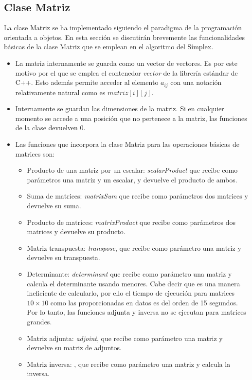\documentclass[12pt, titlepage]{article}
\begin{document}
\subsection{Clase Matriz}
La clase Matriz se ha implementado siguiendo el paradigma de la programación orientada a objetos. En esta sección se discutirán brevemente las funcionalidades básicas de la clase Matriz que se emplean en el algoritmo del Símplex.
\begin{itemize}
\item	La matriz internamente se guarda como un vector de vectores. Es por este motivo por el que se emplea el contenedor \textit{vector} de la librería estándar de C++. Esto además permite acceder al elemento $a_{ij}$ con una notación relativamente natural como es $matriz[i][j]$.
\item	Internamente se guardan las dimensiones de la matriz. Si en cualquier momento se accede a una posición que no pertenece a la matriz, las funciones de la clase devuelven $0$. 
\item	Las funciones que incorpora la clase Matriz para las operaciones básicas de matrices son:
\begin{itemize}
\item	Producto de una matriz por un escalar: \textit{scalarProduct} que recibe como parámetros una matriz y un escalar, y devuelve el producto de ambos.
\item	Suma de matrices: \textit{matrixSum} que recibe como parámetros dos matrices y devuelve su suma.
\item	Producto de matrices: \textit{matrixProduct} que recibe como parámetros dos matrices y devuelve su producto.
\item	Matriz transpuesta: \textit{transpose}, que recibe como parámetro una matriz y devuelve su transpuesta.
\item	Determinante: \textit{determinant} que recibe como parámetro una matriz y calcula el determinante usando menores. Cabe decir que es una manera ineficiente de calcularlo, por ello el tiempo de ejecución para matrices $10\times10$ como las proporcionadas en datos es del orden de 15 segundos. Por lo tanto, las funciones adjunta y inversa no se ejecutan para matrices grandes.
\item	Matriz adjunta:	\textit{adjoint}, que recibe como parámetro una matriz y devuelve su matriz de adjuntos.
\item	Matriz inversa:	, que recibe como parámetro una matriz y calcula la inversa.
\end{itemize}

\end{itemize}
\end{document}
